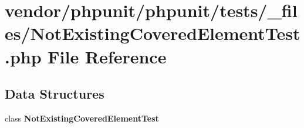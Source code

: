 \section{vendor/phpunit/phpunit/tests/\+\_\+files/\+Not\+Existing\+Covered\+Element\+Test.php File Reference}
\label{phpunit_2tests_2__files_2_not_existing_covered_element_test_8php}
\subsection*{Data Structures}
\begin{DoxyCompactItemize}
\item 
class {\bf Not\+Existing\+Covered\+Element\+Test}
\end{DoxyCompactItemize}

